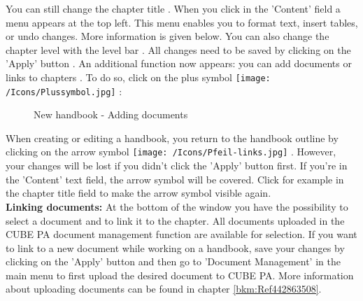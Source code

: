 You can still change the chapter title . When you click in the 'Content' field  a menu  appears at the top left. This menu enables you to format text, insert tables, or undo changes. More information is given below. You can also change the chapter level with the level bar . All changes need to be saved by clicking on the 'Apply' button . An additional function now appears: you can add documents or links to chapters . To do so, click on the plus symbol \texttt{[image: /Icons/Plussymbol.jpg]} : 

\begin{figure}[H]
\caption{New handbook - Adding documents}
\end{figure}

When creating or editing a handbook, you return to the handbook outline by clicking on the arrow symbol \texttt{[image: /Icons/Pfeil-links.jpg]} . However, your changes will be lost if you didn't click the 'Apply' button first. If you're in the 'Content' text field, the arrow symbol will be covered. Click for example in the chapter title field to make the arrow symbol visible again. \\

\textbf{Linking documents:} At the bottom of the window you have the possibility to select a document and to link it to the chapter. All documents uploaded in the CUBE PA document management function are available for selection. If you want to link to a new document while working on a handbook, save your changes by clicking on the 'Apply' button and then go to 'Document Management' in the main menu to first upload the desired document to CUBE PA. More information about uploading documents can be found in chapter \ref{bkm:Ref442863508}. \\

